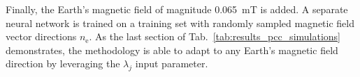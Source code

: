 Finally, the Earth's magnetic field of magnitude \SI{0.065}{mT} is added. A separate neural network is trained on a training set with randomly sampled magnetic field vector directions $n_\mathrm{e}$. As the last section of Tab.~\ref{tab:results_pcc_simulations} demonstrates, the methodology is able to adapt to any Earth's magnetic field direction by leveraging the $\lambda_j$ input parameter.


